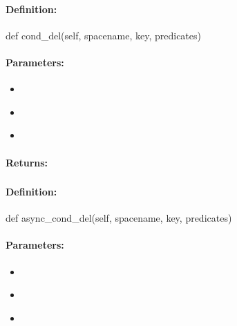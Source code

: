 \paragraph{Definition:}
\begin{pythoncode}
def cond_del(self, spacename, key, predicates)
\end{pythoncode}

\paragraph{Parameters:}
\begin{itemize}[noitemsep]
\item {}\\

\item {}\\

\item {}\\

\end{itemize}

\paragraph{Returns:}


\pagebreak
\subsubsection{}
\label{api:python:async_cond_del}


\paragraph{Definition:}
\begin{pythoncode}
def async_cond_del(self, spacename, key, predicates)
\end{pythoncode}

\paragraph{Parameters:}
\begin{itemize}[noitemsep]
\item {}\\

\item {}\\

\item {}\\

\end{itemize}

